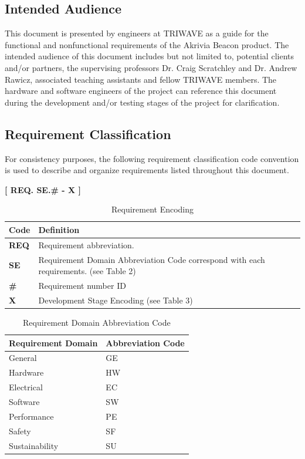 \bigskip
\subsection{Intended Audience}
This document is presented by engineers at TRIWAVE as a guide for the functional and nonfunctional requirements of the Akrivia Beacon product. The intended audience of this document includes but not limited to, potential clients and/or partners, the supervising professors Dr. Craig Scratchley and Dr. Andrew Rawicz, associated teaching assistants and fellow TRIWAVE members. The hardware and software engineers of the project can reference this document during the development and/or testing stages of the project for clarification.

\break

\subsection{Requirement Classification}
\bigskip
For consistency purposes, the following requirement classification code convention is used to describe and organize requirements listed throughout this document. 
\begin{center}
\bigskip
	\textbf{[ REQ. SE.\# - X ]} 
\end{center}

\bgroup
\def\arraystretch{1.5}
\begin{table}[H]
\centering
\begin{tabular}{ | m{1cm} | m{13cm}| } 
\hline
\rowcolor{lightgray} \textbf{Code} & \textbf{Definition} \\ 
\hline
 \textbf{REQ} & Requirement abbreviation.  \\ 
\hline
 \textbf{SE} & Requirement Domain Abbreviation Code correspond with each requirements. (see Table 2)\\   
\hline
 \textbf{\#} & Requirement number ID \\ 
\hline
 \textbf{X} & Development Stage Encoding (see Table 3)\\ 
\hline
\end{tabular}
\caption{Requirement Encoding}
\end{table}

\bgroup
\def\arraystretch{1.5}
\begin{table}[H]
\centering
\begin{tabular}{ | m{7cm} | m{7cm}| } 
\hline
\rowcolor{lightgray} \textbf{Requirement Domain} & \textbf{Abbreviation Code} \\ 
\hline
 General & GE\\ 
\hline
 Hardware & HW\\ 
\hline
 Electrical & EC\\  
\hline
 Software & SW\\ 
\hline
 Performance & PE\\ 
\hline
 Safety & SF\\ 
\hline
 Sustainability & SU\\ 
\hline
\end{tabular}
\caption{Requirement Domain Abbreviation Code}
\end{table}

